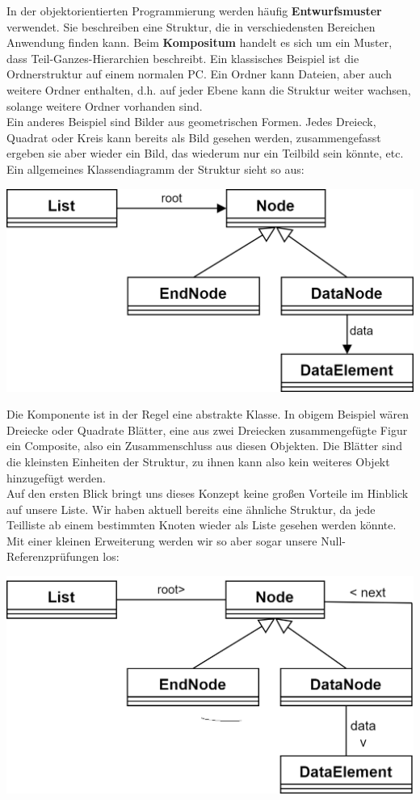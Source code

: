 \documentclass{article}
\begin{document}
In der objektorientierten Programmierung werden häufig \textbf{Entwurfsmuster} verwendet. Sie beschreiben eine Struktur, die in verschiedensten Bereichen Anwendung finden kann. Beim \textbf{Kompositum} handelt es sich um ein Muster, dass Teil-Ganzes-Hierarchien beschreibt. Ein klassisches Beispiel ist die Ordnerstruktur auf einem normalen PC. Ein Ordner kann Dateien, aber auch weitere Ordner enthalten, d.h. auf jeder Ebene kann die Struktur weiter  wachsen, solange weitere Ordner vorhanden sind. \\
Ein anderes Beispiel sind Bilder aus geometrischen Formen. Jedes Dreieck, Quadrat oder Kreis kann bereits als Bild gesehen werden, zusammengefasst ergeben sie aber wieder ein Bild, das wiederum nur ein Teilbild sein könnte, etc. \\
Ein allgemeines Klassendiagramm der Struktur sieht so aus: 
\begin{center}
    \includegraphics[scale=0.2]{../../media/drawio/compositum_lists.png}
\end{center}
Die Komponente ist in der Regel eine abstrakte Klasse. In obigem Beispiel wären Dreiecke oder Quadrate Blätter, eine aus zwei Dreiecken zusammengefügte Figur ein Composite, also ein Zusammenschluss aus diesen Objekten. Die Blätter sind die kleinsten Einheiten der Struktur, zu ihnen kann also kein weiteres Objekt hinzugefügt werden. \\
Auf den ersten Blick bringt uns dieses Konzept keine großen Vorteile im Hinblick auf unsere Liste. Wir haben aktuell bereits eine ähnliche Struktur, da jede Teilliste ab einem bestimmten Knoten wieder als Liste gesehen werden könnte. Mit einer kleinen Erweiterung werden wir so aber sogar unsere Null-Referenzprüfungen los: 
\begin{center}
    \includegraphics[scale=0.2]{../../media/compositum_lists.png}
\end{center}
\end{document}
